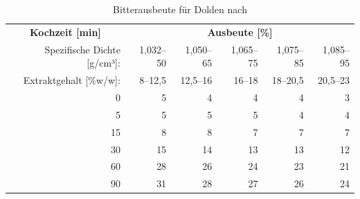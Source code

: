\documentclass[a4paper,parskip=half]{scrartcl}
\begin{document}
\begin{table}[H]
\centering
\begin{tabular}{rrrrrr} 
\toprule
\multicolumn{1}{c}{\textbf{Kochzeit [min]}} & \multicolumn{5}{c}{\textbf{Ausbeute [\%]}}                                 \\
Spezifische Dichte [g/cm³]:                    & 1,032–50 & 1,050–65 & 1,065–75 & 1,075–85 & 1,085–95  \\
Extraktgehalt [\%w/w]:                    & 8–12,5 & 12,5–16 & 16–18 & 18–20,5 & 20,5–23  \\
\midrule                                             
0                                            & 5        & 4        & 4                            & 4                            & 3                             \\
5                                            & 5        & 5        & 5                            & 4                            & 4                             \\
15                                           & 8        & 8        & 7                            & 7                            & 7                             \\
30                                           & 15       & 14       & 13                           & 13                           & 12                            \\
60                                           & 28       & 26       & 24                           & 23                           & 21                            \\
90                                           & 31       & 28       & 27                           & 26                           & 24                            \\
\bottomrule
\end{tabular}
\caption{Bitterausbeute für Dolden nach \citeauthor{Noonan1996} \parencite[215]{Noonan1996}}
\label{table:noonanutil}
\end{table}
\end{document}
